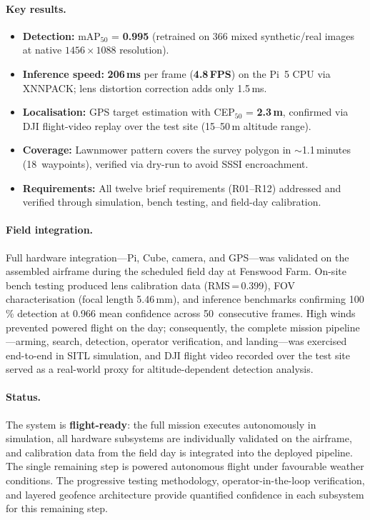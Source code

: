 \paragraph{Key results.}
\begin{itemize}[nosep,leftmargin=1.5em]
  \item \textbf{Detection:} mAP$_{50}$ = \textbf{0.995} (retrained on 366 mixed synthetic/real images at native $1456 \times 1088$ resolution).
  \item \textbf{Inference speed:} \textbf{206\,ms} per frame (\textbf{4.8\,FPS}) on the Pi~5 CPU via XNNPACK; lens distortion correction adds only 1.5\,ms.
  \item \textbf{Localisation:} GPS target estimation with CEP$_{50}$ = \textbf{2.3\,m}, confirmed via DJI flight-video replay over the test site (15--50\,m altitude range).
  \item \textbf{Coverage:} Lawnmower pattern covers the survey polygon in $\sim$1.1\,minutes (18~waypoints), verified via dry-run to avoid SSSI encroachment.
  \item \textbf{Requirements:} All twelve brief requirements (R01--R12) addressed and verified through simulation, bench testing, and field-day calibration.
\end{itemize}

\paragraph{Field integration.}
Full hardware integration---Pi, Cube, camera, and GPS---was validated on the assembled airframe during the scheduled field day at Fenswood Farm. On-site bench testing produced lens calibration data (RMS\,=\,0.399), FOV characterisation (focal length 5.46\,mm), and inference benchmarks confirming 100\,\% detection at 0.966 mean confidence across 50~consecutive frames. High winds prevented powered flight on the day; consequently, the complete mission pipeline---arming, search, detection, operator verification, and landing---was exercised end-to-end in SITL simulation, and DJI flight video recorded over the test site served as a real-world proxy for altitude-dependent detection analysis.

\paragraph{Status.}
The system is \textbf{flight-ready}: the full mission executes autonomously in simulation, all hardware subsystems are individually validated on the airframe, and calibration data from the field day is integrated into the deployed pipeline. The single remaining step is powered autonomous flight under favourable weather conditions. The progressive testing methodology, operator-in-the-loop verification, and layered geofence architecture provide quantified confidence in each subsystem for this remaining step.
